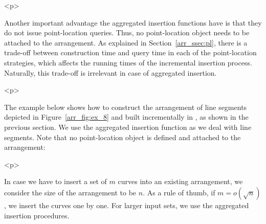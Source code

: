 \begin{ccHtmlOnly}<p>\end{ccHtmlOnly}
Another important advantage the aggregated insertion functions
have is that they do not issue point-location queries. Thus, no
point-location object needs to be attached to the arrangement. As
explained in Section~\ref{arr_ssec:pl}, there is a trade-off
between construction time and query time in each of the
point-location strategies, which affects the running times of the
incremental insertion process. Naturally, this trade-off is irrelevant
in case of aggregated insertion.

\begin{ccHtmlOnly}<p>\end{ccHtmlOnly}
The example below shows how to construct the arrangement of
line segments depicted in Figure~\ref{arr_fig:ex_8} and built
incrementally in , as shown in the previous
section. We use the aggregated insertion function
 as we deal with line segments.
Note that no point-location object is defined and attached to the
arrangement:


\begin{ccHtmlOnly}<p>\end{ccHtmlOnly}
In case we have to insert a set of $m$ curves into an existing
arrangement, we consider the size of the arrangement to be $n$.
As a rule of thumb, if $m = o(\sqrt{n})$, we insert the curves one by
one. For larger input sets, we use the aggregated insertion procedures.

